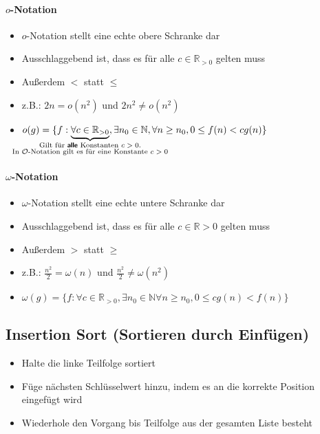 \documentclass[
    ngerman,
    color=3b,
    dark_mode,
    load_common, %
    summary,
    boxarc,
]{rubos-tuda-template}
\begin{document}
\paragraph{$o$-Notation}
\begin{itemize}
    \item $o$-Notation stellt eine echte obere Schranke dar
    \item Ausschlaggebend ist, dass es für alle $c \in \mathbb{R}_{>0}$ gelten muss
    \item Au\ss erdem $<$ statt $\leq$
    \item z.B.: $2n = o(n^2)$ und $2n^2 \neq o(n^2)$
    \item[] %
        $o(g)=\{f:\underbrace{\forall c \in \mathbb{R}_{>0}}_{
            \mathclap{
                \substack{
                    \text{Gilt für \fatsf{alle} Konstanten $c>0$.}\\
                    \text{In $\mathcal{O}$-Notation gilt es für eine Konstante $c>0$}}}
            }, \exists n_0 \in \mathbb{N}, \forall n \geq n_0, 0\leq f(n)<cg(n)\}$
\end{itemize}

\paragraph{$\omega$-Notation}
\begin{itemize}
    \item $\omega$-Notation stellt eine echte untere Schranke dar
    \item Ausschlaggebend ist, dass es für alle $c \in \mathbb{R}{>0}$ gelten muss
    \item Au\ss erdem $>$ statt $\geq$
    \item z.B.: $\frac{n^2}{2} = \omega(n)$ und $\frac{n^2}{2} \neq \omega(n^2)$
    \item[] %
        $\omega(g)=\{f:\forall c \in \mathbb{R}_{>0},\exists n_0 \in \mathbb{N} \forall n \geq n_0,0\leq cg(n)<f(n)\}$
\end{itemize}
\clearpage
\subsection{Insertion Sort \textmd{(Sortieren durch Einfügen)}}\label{InsertionSort}
\begin{idea}\mbox{}
    \begin{itemize}
        \item Halte die linke Teilfolge sortiert
        \item Füge nächsten Schlüsselwert hinzu, indem es an die korrekte Position eingefügt wird
        \item Wiederhole den Vorgang bis Teilfolge aus der gesamten Liste besteht
    \end{itemize}
\end{idea}
\end{document}
